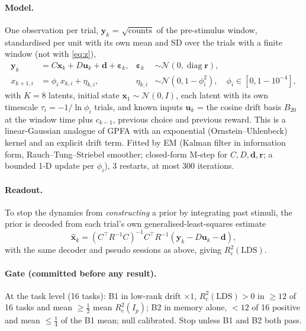 \documentclass[11pt]{article}
\newcommand{\Rc}{R^2_{\mathrm{c}}}
\begin{document}
\paragraph{Model.} One observation per trial, $\bm y_k$ = $\sqrt{\text{counts}}$ of the pre-stimulus window,
standardised per unit with its own mean and SD over the trials with a finite window (not with \eqref{eq:z}),
\begin{align}
\bm y_k &= C \bm x_k + D \bm u_k + \bm d + \bm\varepsilon_k, & \bm\varepsilon_k &\sim \mathcal N(0, \operatorname{diag}\bm r), \\
x_{k+1,i} &= \phi_i\, x_{k,i} + \eta_{k,i}, & \eta_{k,i} &\sim \mathcal N(0, 1 - \phi_i^2),\quad \phi_i \in [0, 1 - 10^{-4}],
\end{align}
with $K = 8$ latents, initial state $\bm x_1 \sim \mathcal N(0, I)$, each latent with its own timescale
$\tau_i = -1/\ln\phi_i$ trials, and known inputs $\bm u_k$ = the cosine drift basis $B_{20}$ at the window time plus
$c_{k-1}$, previous choice and previous reward. This is a
linear-Gaussian analogue of GPFA with an exponential (Ornstein--Uhlenbeck) kernel and an explicit drift term. Fitted
by EM (Kalman filter in information form, Rauch--Tung--Striebel smoother; closed-form M-step for $C, D, \bm d, \bm r$;
a bounded 1-D update per $\phi_i$), 3 restarts, at most 300 iterations.

\paragraph{Readout.} To stop the dynamics from \emph{constructing} a prior by integrating past stimuli, the prior is
decoded from each trial's own generalised-least-squares estimate
\begin{equation}
\hat{\bm x}_k = (C^\top R^{-1} C)^{-1} C^\top R^{-1}(\bm y_k - D\bm u_k - \bm d),
\end{equation}
with the same decoder and pseudo sessions as above, giving $\Rc(\mathrm{LDS})$.

\paragraph{Gate (committed before any result).} At the task level (16 tasks): B1 in low-rank drift $\times1$,
$\Rc(\mathrm{LDS}) > 0$ in $\ge 12$ of 16 tasks and mean $\ge \frac12$ mean $\Rc(I_p)$; B2 in memory alone, $< 12$ of
16 positive and mean $\le \frac14$ of the B1 mean; null calibrated. Stop unless B1 and B2 both pass.
\end{document}
